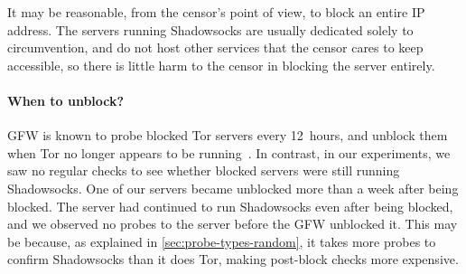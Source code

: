 \documentclass[sigconf,letterpaper]{acmart}
\begin{document}
It may be reasonable, from the censor's point of view, to block an entire IP address.
The servers running Shadowsocks are usually dedicated solely to circumvention,
and do not host other services that the censor cares to keep accessible,
so there is little harm to the censor in blocking the server entirely.

\paragraph{When to unblock?}
GFW is known to probe blocked Tor servers every 12~hours,
and unblock them when Tor no longer appears to be running~\cite{Winter2012a}.
In contrast, in our experiments,
we saw no regular checks to see whether blocked servers were still running Shadowsocks.
One of our servers became unblocked more than a week after being blocked.
The server had continued to run Shadowsocks even after being blocked,
and we observed no probes to the server before the GFW unblocked it.
This may be because,
as explained in \autoref{sec:probe-types-random},
it takes more probes to confirm Shadowsocks than it does Tor,
making post-block checks more expensive.





\end{document}
